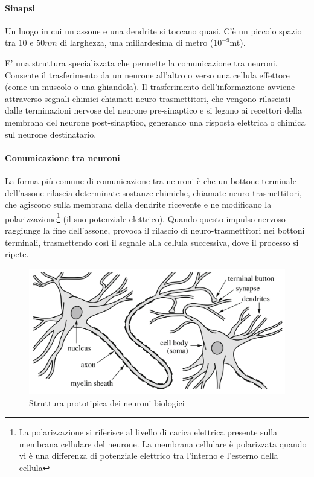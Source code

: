 \paragraph{Sinapsi} 
Un luogo in cui un assone e una dendrite si toccano quasi. C'è un piccolo spazio tra $10$ e $50 nm$ di larghezza, una miliardesima di metro ($10^{-9}$mt).

E' una struttura specializzata che permette la comunicazione tra neuroni. Consente il trasferimento da un neurone all'altro o verso una cellula effettore (come un muscolo o una ghiandola). Il trasferimento dell'informazione avviene attraverso segnali chimici chiamati neuro-trasmettitori, che vengono rilasciati dalle terminazioni nervose del neurone pre-sinaptico e si legano ai recettori della membrana del neurone post-sinaptico, generando una risposta elettrica o chimica sul neurone destinatario.

\paragraph{Comunicazione tra neuroni}
La forma più comune di comunicazione tra neuroni è che un bottone terminale dell'assone rilascia determinate sostanze chimiche, chiamate neuro-trasmettitori, che agiscono sulla membrana della dendrite ricevente e ne modificano la polarizzazione\footnote{La polarizzazione si riferisce al livello di carica elettrica presente sulla membrana cellulare del neurone. La membrana cellulare è polarizzata quando vi è una differenza di potenziale elettrico tra l'interno e l'esterno della cellula} (il suo potenziale elettrico). Quando questo impulso nervoso raggiunge la fine dell'assone, provoca il rilascio di neuro-trasmettitori nei bottoni terminali, trasmettendo così il segnale alla cellula successiva, dove il processo si ripete.

\begin{figure}[h]
    \centering
    \includegraphics[scale=0.4]{images/neuron.png}
    \caption{Struttura prototipica dei neuroni biologici}
\end{figure}

